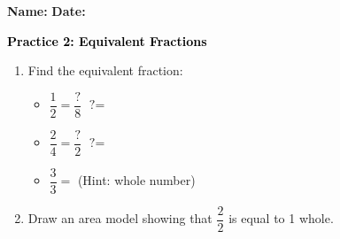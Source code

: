 \documentclass[12pt, letterpaper, fleqn]{article}
\newcommand{\blank}{\underline{\hspace{2.2cm}}}
\begin{document}
\textbf{Name:} \underline{\hspace{5cm}}
\hfill
\textbf{Date:} \underline{\hspace{3cm}}\\

\begin{tcolorbox}[colback=customteal!20]
    \large\textcolor{black}{\textbf{Practice 2: Equivalent Fractions}}
\end{tcolorbox}

\vspace{5mm}
\begin{enumerate}[itemsep=2.5cm, leftmargin=0.6cm]
\item Find the equivalent fraction:
\begin{itemize}[itemsep=1cm]
  \item $\dfrac{1}{2} = \dfrac{\text{?}}{8}$ \quad $\text{?} =$ \blank
  \item $\dfrac{2}{4} = \dfrac{\text{?}}{2}$ \quad $\text{?} =$ \blank
  \item $\dfrac{3}{3} = $ \blank \quad (Hint: whole number)
\end{itemize}

\item Draw an area model showing that $\dfrac{2}{2}$ is equal to 1 whole.
\end{enumerate}
\end{document}
